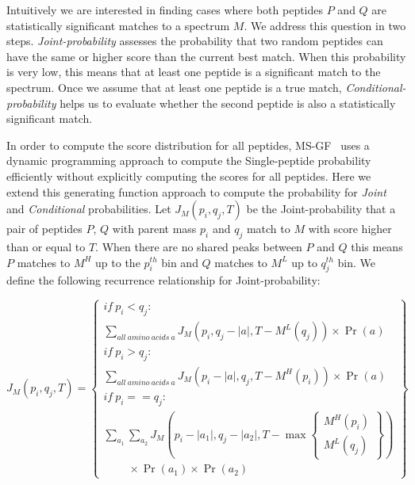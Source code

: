 \documentclass[arial,11pt]{article}
\begin{document}
Intuitively we are interested in finding cases where both peptides $P$ and $Q$ are statistically significant matches to a spectrum $M$. We address this question in two steps.  \emph{Joint-probability} assesses the probability  that two random peptides can have the same or higher score than the current best match.  When this probability is very low, this means that at least one peptide is a significant match to the spectrum. Once we assume that at least one peptide is a true match, \emph{Conditional-probability} helps us to evaluate whether the second peptide is also a statistically significant match.

In order to compute the score distribution for all peptides, MS-GF~\cite{kim2008spectral} uses a dynamic programming approach to compute the Single-peptide probability efficiently without explicitly computing the scores for all peptides.  Here we extend this generating function approach to compute the probability for \emph{Joint} and \emph{Conditional} probabilities.
Let $J_M(p_{i}, q_{j}, T)$ be the Joint-probability that a pair of peptides $P$, $Q$ with parent mass $p_{i}$ and $q_{j}$ match to $M$ with score higher than or equal to $T$. When there are no shared peaks between $P$ and $Q$ this means $P$ matches to $M^{H}$ up to the $p_{i}^{th}$ bin and $Q$ matches to $M^{L}$ up to $q_{j}^{th}$ bin.  %
We  define the following recurrence relationship for Joint-probability:

\begin{equation}
J_M(p_{i},q_{j},T) = \left\{
\begin{array}{l}
  if\ p_{i} < q_{j}: \\
      \displaystyle\sum\limits_{all\ amino\ acids\ a}{J_M(p_{i}, q_{j} - |a|, T - M^{L}(q_{j}))\times \Pr(a)} \\
  if\ p_{i} > q_{j}:\\
      \displaystyle\sum\limits_{all\ amino\ acids\ a}{ J_M(p_{i} - |a|, q_{j}, T - M^{H}(p_{i}))\times \Pr(a)} \\
  if\ p_{i} == q_{j}: \\
  \sum\limits_{a_1}{\sum\limits_{a_2}{J_M(p_{i} - |a_1|, q_{j} - |a_2|,
        T - \max \left\{
                  \begin{array}{c}
                   M^{H}(p_{i}) \\
                   M^{L}(q_{j})
                  \end{array}
                 \right\})}} \\
                 \ \ \ \ \ \ \ \ \ \ \times \Pr(a_1) \times \Pr(a_2)
\end{array}
\right\}
\label{mixgf.dprec}
\end{equation}
\end{document}
